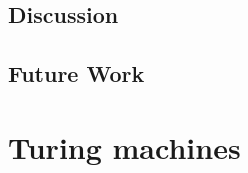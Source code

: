 \documentclass[a4paper,british]{article}
\theoremstyle{definition} %
\numberwithin{equation}{section}
\theoremstyle{definition} %
\begin{document}
\newpage
\subsection{Discussion}\label{sec:intro:discuss}


\subsection{Future Work}

\newpage
\section{Turing machines}\label{sec:TMs}

\vspace{-22pt}
\end{document}
